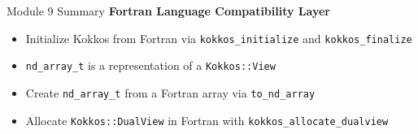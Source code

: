

\begin{frame}{Module 9 Summary}
\textbf{Fortran Language Compatibility Layer}
\begin{itemize}
  \item Initialize Kokkos from Fortran via \texttt{kokkos\_initialize} and \texttt{kokkos\_finalize}
  \item \texttt{nd\_array\_t} is a representation of a \texttt{Kokkos::View}
  \item Create \texttt{nd\_array\_t} from a Fortran array via \texttt{to\_nd\_array}
  \item Allocate \texttt{Kokkos::DualView} in Fortran with \texttt{kokkos\_allocate\_dualview}
\end{itemize}
\end{frame}



